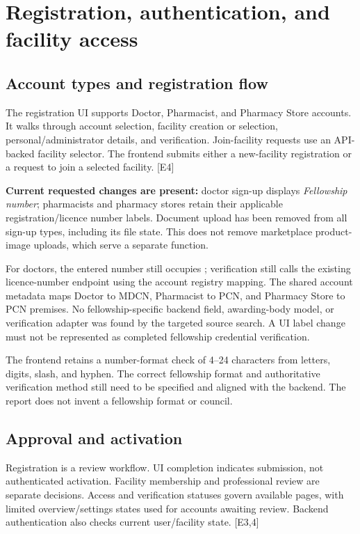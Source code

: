 \documentclass[11pt,a4paper]{article}
\newcommand{\source}[1]{{\small\path{#1}}}
\newcommand{\evidence}[1]{\textcolor{muted}{[E#1]}}
\begin{document}
\normalsize

\section{Registration, authentication, and facility access}
\subsection{Account types and registration flow}
The registration UI supports Doctor, Pharmacist, and Pharmacy Store accounts. It walks through account selection, facility creation or selection, personal/administrator details, and verification. Join-facility requests use an API-backed facility selector. The frontend submits either a new-facility registration or a request to join a selected facility. \evidence{4}

\textbf{Current requested changes are present:} doctor sign-up displays \emph{Fellowship number}; pharmacists and pharmacy stores retain their applicable registration/licence number labels. Document upload has been removed from all sign-up types, including its file state. This does not remove marketplace product-image uploads, which serve a separate function.

For doctors, the entered number still occupies \source{license.number}; verification still calls the existing licence-number endpoint using the account registry mapping. The shared account metadata maps Doctor to MDCN, Pharmacist to PCN, and Pharmacy Store to PCN premises. No fellowship-specific backend field, awarding-body model, or verification adapter was found by the targeted source search. A UI label change must not be represented as completed fellowship credential verification.

The frontend retains a number-format check of 4--24 characters from letters, digits, slash, and hyphen. The correct fellowship format and authoritative verification method still need to be specified and aligned with the backend. The report does not invent a fellowship format or council.

\subsection{Approval and activation}
Registration is a review workflow. UI completion indicates submission, not authenticated activation. Facility membership and professional review are separate decisions. Access and verification statuses govern available pages, with limited overview/settings states used for accounts awaiting review. Backend authentication also checks current user/facility state. \evidence{3,4}
\end{document}
